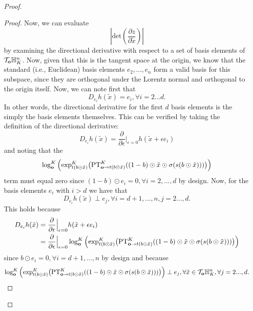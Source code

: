 \begin{proof}
\begin{proof}
Now, we can evaluate 
$$
\left|\textrm{det}\left(\frac{\partial z}{\partial \tilde{x}}\right)\right|
$$
by examining the directional derivative with respect to a set of basis elements of $\mathcal{T}_{\mathbf{o}}\mathbb{H}^{n}_K$.
Now, given that this is the tangent space at the origin, we know that the standard (i.e., Euclidean) basis elements $e_2, ..., e_n$ form a valid basis for this subspace, since they are orthogonal under the Lorentz normal and orthogonal to the origin itself. 
Now, we can note first that
\begin{equation}
    D_{e_i}h(\tilde{x}) = e_i, \forall i=2...d.
\end{equation}
In other words, the directional derivative for the first $d$ basis elements is the simply the basis elements themselves. This can be verified by taking the definition of the directional derivative:
\begin{equation}
     D_{e_i}h(\tilde{x})  = \frac{\partial}{\partial \epsilon}\Big|_{\epsilon = 0}h(\tilde{x} + \epsilon e_i)
\end{equation}
and noting that the 
$$
\log^K_{\textbf{o}}\Big( \textnormal{exp}^K_{t(b \odot \tilde{x})}\big(\textnormal{PT}^K_{\textbf{o}\to t(b \odot \tilde{x}) }((1-b) \odot \tilde{x} \odot \sigma(s(b \odot \tilde{x})))\big)\Big)
$$
term must equal zero since $(1-b)\odot e_i = 0, \forall i = 2, ..., d$ by design. 
Now, for the basis elements $e_i$ with $i>d$ we have that
\begin{equation}
     D_{e_i}h(\tilde{x}) \perp e_j, \forall i=d+1, ..., n, j=2...,d.
\end{equation}
This holds because 
\begin{align}
D_{e_i}h(\tilde{x})  &= \frac{\partial}{\partial \epsilon}\Big|_{\epsilon = 0}h(\tilde{x} + \epsilon e_i) \\
 &= \frac{\partial}{\partial \epsilon}\Big|_{\epsilon = 0}    \log^K_{\textbf{o}}\Big( \textnormal{exp}^K_{t(b \odot \tilde{x})}\big(\textnormal{PT}^K_{\textbf{o}\to t(b \odot \tilde{x}) }((1-b) \odot \tilde{x} \odot \sigma(s(b \odot \tilde{x})))\big)\Big) 
\end{align}
since $b \odot e_i = 0, \forall i = d+1, ..., n$ by design and because
\begin{equation}
   \log^K_{\textbf{o}}\Big( \textnormal{exp}^K_{t(b \odot \tilde{x})}\big(\textnormal{PT}^K_{\textbf{o}\to t(b \odot \tilde{x}) }((1-b) \odot \tilde{x} \odot \sigma(s(b \odot \tilde{x})))\big)\Big) \perp e_j, \forall \tilde{x} \in \mathcal{T}_{\mathbf{o}}\mathbb{H}^n_K, \forall  j=2...,d.
\end{equation}

\end{proof}
\end{proof}
